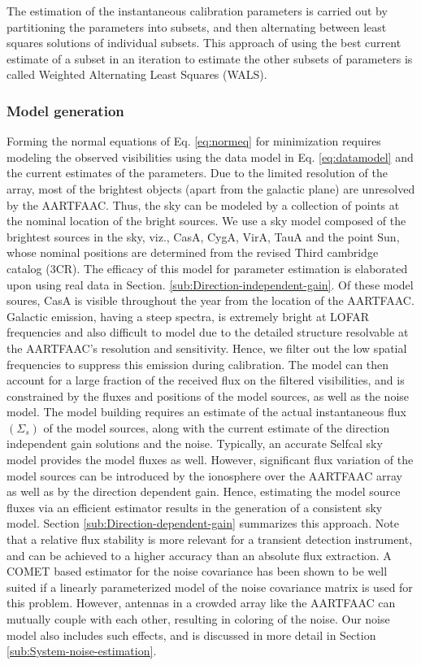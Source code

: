 \documentclass{aa}
\begin{document}
The estimation of the instantaneous calibration parameters is carried
out by partitioning the parameters into subsets, and then alternating
between least squares solutions of individual subsets. This approach
of using the best current estimate of a subset in an iteration to
estimate the other subsets of parameters is called Weighted Alternating
Least Squares (WALS).


\subsubsection{\label{sub:Model-generation}Model generation}

Forming the normal equations of Eq. \ref{eq:normeq} for minimization
requires modeling the observed visibilities using the data model in
Eq. \ref{eq:datamodel} and the current estimates of the parameters.
Due to the limited resolution of the array, most of the brightest
objects (apart from the galactic plane) are unresolved by the AARTFAAC.
Thus, the sky can be modeled by a collection of points at the nominal
location of the bright sources. We use a sky model composed of the
brightest sources in the sky, viz., CasA, CygA, VirA, TauA and the
point Sun, whose nominal positions are determined from the revised
Third cambridge catalog (3CR). The efficacy of this model for parameter
estimation is elaborated upon using real data in Section. \ref{sub:Direction-independent-gain}.
Of these model soures, CasA is visible throughout the year from the
location of the AARTFAAC. Galactic emission, having a steep spectra,
is extremely bright at LOFAR frequencies and also difficult to model
due to the detailed structure resolvable at the AARTFAAC's resolution
and sensitivity. Hence, we filter out the low spatial frequencies
to suppress this emission during calibration. The model can then account
for a large fraction of the received flux on the filtered visibilities,
and is constrained by the fluxes and positions of the model sources,
as well as the noise model. The model building requires an estimate
of the actual instantaneous flux $\left(\Sigma_{s}\right)$ of the
model sources, along with the current estimate of the direction independent
gain solutions and the noise. Typically, an accurate Selfcal sky model
provides the model fluxes as well. However, significant flux variation
of the model sources can be introduced by the ionosphere over the
AARTFAAC array as well as by the direction dependent gain. Hence,
estimating the model source fluxes via an efficient estimator results
in the generation of a consistent sky model. Section \ref{sub:Direction-dependent-gain}
summarizes this approach. Note that a relative flux stability is more
relevant for a transient detection instrument, and can be achieved
to a higher accuracy than an absolute flux extraction. A COMET based
estimator for the noise covariance has been shown to be well suited
if a linearly parameterized model of the noise covariance matrix is
used for this problem\citep{ottersten1998covariance}. However, antennas
in a crowded array like the AARTFAAC can mutually couple with each
other, resulting in coloring of the noise. Our noise model also includes
such effects, and is discussed in more detail in Section \ref{sub:System-noise-estimation}.
\end{document}
